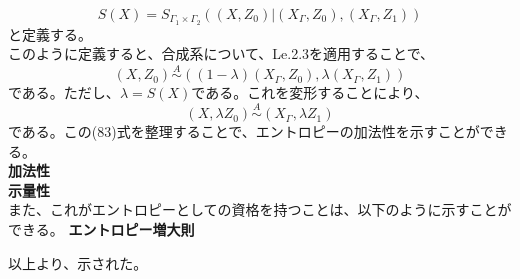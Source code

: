 \documentclass[a4paper,11pt]{jsarticle}
\begin{document}
\begin{equation}
    S(X)=S_{\Gamma_1 \times \Gamma_2}((X,Z_0)|(X_{\Gamma},Z_0),(X_{\Gamma},Z_1))
\end{equation}
と定義する。\\
このように定義すると、合成系について、Le.2.3を適用することで、
\begin{equation}
    (X,Z_0) \overset{A}{\sim} ((1-\lambda)(X_{\Gamma},Z_0),\lambda(X_{\Gamma},Z_1))
\end{equation}
である。ただし、$\lambda = S(X)$である。これを変形することにより、
\begin{equation}
    (X,\lambda Z_0) \overset{A}{\sim} (X_{\Gamma},\lambda Z_1)
\end{equation}
である。この(83)式を整理することで、エントロピーの加法性を示すことができる。\\
\textbf{加法性}\\

\textbf{示量性}\\

また、これがエントロピーとしての資格を持つことは、以下のように示すことができる。
\textbf{エントロピー増大則}

以上より、示された。\qedsymbol\\




    
\end{document}
